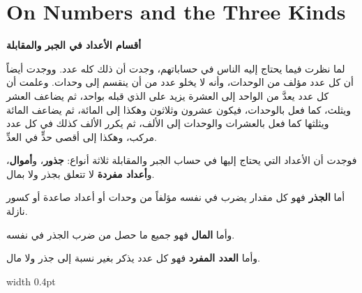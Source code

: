 \documentclass[11pt,a4paper]{book}
\begin{document}
\newpage

\chapter{On Numbers and the Three Kinds}
\label{ch:intro}

\noindent\begin{minipage}[t]{0.48\textwidth}
\raggedleft

\begin{Arabic}
\textbf{أقسام الأعداد في الجبر والمقابلة}

لما نظرت فيما يحتاج إليه الناس في حساباتهم، وجدت أن ذلك كله عدد. ووجدت أيضاً أن كل عدد مؤلف من الوحدات، وأنه لا يخلو عدد من أن ينقسم إلى وحدات. وعلمت أن كل عدد يعدَّ من الواحد إلى العشرة يزيد على الذي قبله بواحد، ثم يضاعف العشر ويثلث، كما فعل بالوحدات، فيكون عشرون وثلاثون وهكذا إلى المائة، ثم يضاعف المائة ويثلثها كما فعل بالعشرات والوحدات إلى الألف، ثم يكرر الألف كذلك في كل عدد مركب، وهكذا إلى أقصى حدٍّ في العدِّ.

فوجدت أن الأعداد التي يحتاج إليها في حساب الجبر والمقابلة ثلاثة أنواع: \textbf{جذور}، و\textbf{أموال}، و\textbf{أعداد مفردة} لا تتعلق بجذر ولا بمال.

أما \textbf{الجذر} فهو كل مقدار يضرب في نفسه مؤلفاً من وحدات أو أعداد صاعدة أو كسور نازلة.

وأما \textbf{المال} فهو جميع ما حصل من ضرب الجذر في نفسه.

وأما \textbf{العدد المفرد} فهو كل عدد يذكر بغير نسبة إلى جذر ولا مال.
\end{Arabic}

\end{minipage}%
\hfill\vrule width 0.4pt\hfill
\end{document}
